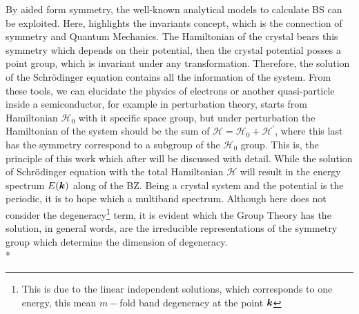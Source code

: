 By aided form symmetry, the well-known analytical models to calculate BS can be exploited. Here, highlights the invariants concept, which is the connection of symmetry and Quantum Mechanics.  The Hamiltonian of the crystal bears this symmetry which depends on their potential, then the crystal potential posses a point group, which is invariant under any transformation. Therefore, the solution of the Schrödinger equation contains all the information of the system. From these tools, we can elucidate the physics of electrons or another quasi-particle inside a semiconductor, for example in perturbation theory, starts from Hamiltonian $\mathscr{H}_{0}$ with it specific space group, but under perturbation the Hamiltonian of the system should be the sum of $\mathscr{H}=\mathscr{H}_{0}+\mathscr{H}^{\prime}$, where this last has the symmetry correspond to a subgroup of the $\mathscr{H}_{0}$ group.
This is, the principle of this work which after will be discussed with detail. While the solution of Schrödinger equation with the total Hamiltonian $\mathscr{H}$ will result in the energy spectrum $E(\boldsymbol{k})$ along of the \gls{BZ}. Being a crystal system and the potential is the periodic, it is to hope which a multiband spectrum. Although here does not consider the degeneracy\footnote{This is due to the  linear independent solutions, which corresponds to one energy, this mean $m-$fold  band degeneracy at the point $\boldsymbol{k}$\cite{bir1974symmetry}} term, it is evident which the Group Theory has the solution, in general words,   are the irreducible representations of the symmetry group which determine the dimension of degeneracy\cite{bir1974symmetry}. \\*
